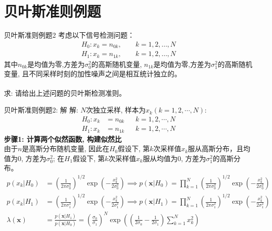 \section{贝叶斯准则例题}

\begin{frame}{贝叶斯准则例题2}
考虑以下信号检测问题：
\begin{align*}
H_0: x_k=n_{0k}, \qquad k=1,2,\dots,N\\
H_1: x_k=n_{1k}, \qquad k=1,2,\dots,N
\end{align*}
其中$n_{0k}$是均值为零,方差为$\sigma_0^2$的高斯随机变量, $n_{1k}$是均值为零,方差为$\sigma_1^2$的高斯随机变量,  且不同采样时刻的加性噪声之间是相互统计独立的。\\
~\\
求: 请给出上述问题的贝叶斯检测准则。
\end{frame}

\begin{frame}[shrink]{贝叶斯准则例题2: 解}
解: $N$次独立采样, 样本为$x_k(k=1,2,\cdots,N)$:
\begin{align*}
H_0: x_k&=n_{0k} && k=1,2,\cdots,N\\
H_1: x_k&=n_{1k} && k=1,2,\cdots,N
\end{align*}
\textbf{步骤1: 计算两个似然函数, 构建似然比}\\
由于$n$是高斯分布随机变量, 因此在$H_0$假设下, 第$k$次采样值$x_k$服从高斯分布，且均值为0, 方差为$\sigma_0^2$; 在$H_1$假设下, 第$k$次采样值$x_k$服从均值为0, 方差为$\sigma_1^2$的高斯分布。
\begin{align*}
p(x_k|H_0)&=\left(\frac{1}{2\pi\sigma_0^2}\right)^{1/2}\exp\left(-\frac{x_k^2}{2\sigma_0^2}\right)\implies p(\bm{x}|H_0)=\prod_{k=1}^{N}\left(\frac{1}{2\pi\sigma_0^2}\right)^{1/2}\exp\left(-\frac{x_k^2}{2\sigma_0^2}\right)\\
p(x_k|H_1)&=\left(\frac{1}{2\pi\sigma_1^2}\right)^{1/2}\exp\left(-\frac{x_k^2}{2\sigma_1^2}\right)\implies p(\bm{x}|H_1)=\prod_{k=1}^{N}\left(\frac{1}{2\pi\sigma_1^2}\right)^{1/2}\exp\left(-\frac{x_k^2}{2\sigma_1^2}\right)\\
\lambda(\bm{x})&=\frac{p(\bm{x}|H_1)}{p(\bm{x}|H_0)}=\left(\frac{\sigma_0}{\sigma_1}\right)^N\exp\left(\left(\frac{1}{2\sigma_0}-\frac{1}{2\sigma_1}\right)\sum\limits_{k=1}^{N}x_k^2\right)
\end{align*} 
\end{frame}

